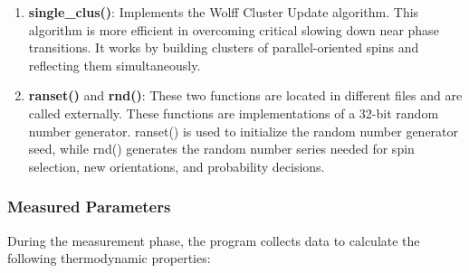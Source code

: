 \begin{enumerate}
\item \textbf{single\_clus()}: Implements the Wolff Cluster Update algorithm. This algorithm is more efficient in overcoming critical slowing down near phase transitions. It works by building clusters of parallel-oriented spins and reflecting them simultaneously.

\item \textbf{ranset()} and \textbf{rnd()}: These two functions are located in different files and are called externally. These functions are implementations of a 32-bit random number generator. ranset() is used to initialize the random number generator seed, while rnd() generates the random number series needed for spin selection, new orientations, and probability decisions.
\end{enumerate}

\subsubsection{Measured Parameters}

During the measurement phase, the program collects data to calculate the following thermodynamic properties:

